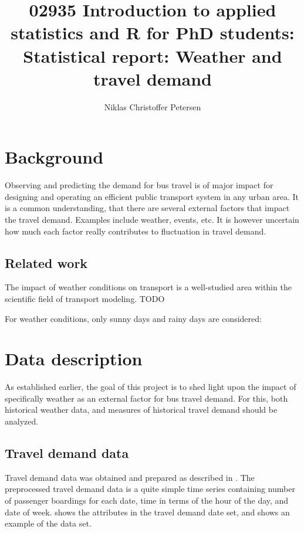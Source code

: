 \documentclass[a4paper,11pt]{article}
\title{{\small 02935 Introduction to applied statistics and R for PhD students: }\\[1em]Statistical report: Weather and travel demand}
\author{Niklas Christoffer Petersen}
\affil{Transport Modelling, Department of Management Engineering \\ Technical University of Denmark, 2800 Kongens Lyngby, Denmark}
\begin{document}
\singlespace
\maketitle
\thispagestyle{empty}
\clearpage

\onehalfspacing
{}
\tableofcontents
\clearpage

\section{Background}\label{ch:background}

Observing and predicting the demand for bus travel is of major impact for designing and operating an efficient public transport system in any urban area. It is a common understanding, that there are several external factors that impact the travel demand. Examples include weather, events, etc. It is however uncertain how much each factor really contributes to fluctuation in travel demand. 

\subsection{Related work}\label{ch:relatedWork}
The impact of weather conditions on transport is a well-studied area within the scientific field of transport modeling.
TODO

For weather conditions, only sunny days and rainy days are considered: \citet{Yo2010}

\clearpage

\section{Data description}\label{ch:desc}
As established earlier, the goal of this project is to shed light upon the impact of specifically weather as an external factor for bus travel demand. For this, both historical weather data, and measures of historical travel demand should be analyzed.

\subsection{Travel demand data}\label{ch:desc_traveldemand}

Travel demand data was obtained and prepared as described in . The preprocessed travel demand data is a quite simple time series containing number of passenger boardings for each date, time in terms of the hour of the day, and date of week.  shows the attributes in the travel demand date set, and  shows an example of the data set.
\end{document}

